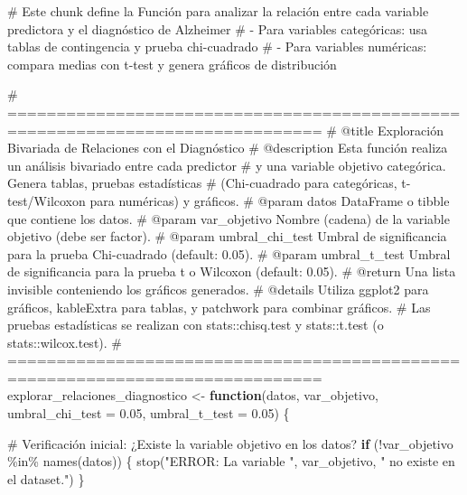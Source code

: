 \documentclass[
  letterpaper,
  DIV=11,
  numbers=noendperiod]{scrartcl}
\newenvironment{Shaded}{\begin{snugshade}}{\end{snugshade}}
\newcommand{\AttributeTok}[1]{\textcolor[rgb]{0.40,0.45,0.13}{#1}}
\newcommand{\CommentTok}[1]{\textcolor[rgb]{0.37,0.37,0.37}{#1}}
\newcommand{\ControlFlowTok}[1]{\textcolor[rgb]{0.00,0.23,0.31}{\textbf{#1}}}
\newcommand{\FloatTok}[1]{\textcolor[rgb]{0.68,0.00,0.00}{#1}}
\newcommand{\FunctionTok}[1]{\textcolor[rgb]{0.28,0.35,0.67}{#1}}
\newcommand{\NormalTok}[1]{\textcolor[rgb]{0.00,0.23,0.31}{#1}}
\newcommand{\OtherTok}[1]{\textcolor[rgb]{0.00,0.23,0.31}{#1}}
\newcommand{\SpecialCharTok}[1]{\textcolor[rgb]{0.37,0.37,0.37}{#1}}
\newcommand{\StringTok}[1]{\textcolor[rgb]{0.13,0.47,0.30}{#1}}
\begin{document}
\begin{Shaded}
\begin{Highlighting}[]
\CommentTok{\# Este chunk define la Función para analizar la relación entre cada variable predictora y el diagnóstico de Alzheimer}
\CommentTok{\# {-} Para variables categóricas: usa tablas de contingencia y prueba chi{-}cuadrado}
\CommentTok{\# {-} Para variables numéricas: compara medias con t{-}test y genera gráficos de distribución}

\CommentTok{\# ==============================================================================}
\CommentTok{\#\textquotesingle{} @title Exploración Bivariada de Relaciones con el Diagnóstico}
\CommentTok{\#\textquotesingle{} @description Esta función realiza un análisis bivariado entre cada predictor}
\CommentTok{\#\textquotesingle{} y una variable objetivo categórica. Genera tablas, pruebas estadísticas}
\CommentTok{\#\textquotesingle{} (Chi{-}cuadrado para categóricas, t{-}test/Wilcoxon para numéricas) y gráficos.}
\CommentTok{\#\textquotesingle{} @param datos DataFrame o tibble que contiene los datos.}
\CommentTok{\#\textquotesingle{} @param var\_objetivo Nombre (cadena) de la variable objetivo (debe ser factor).}
\CommentTok{\#\textquotesingle{} @param umbral\_chi\_test Umbral de significancia para la prueba Chi{-}cuadrado (default: 0.05).}
\CommentTok{\#\textquotesingle{} @param umbral\_t\_test Umbral de significancia para la prueba t o Wilcoxon (default: 0.05).}
\CommentTok{\#\textquotesingle{} @return Una lista invisible conteniendo los gráficos generados.}
\CommentTok{\#\textquotesingle{} @details Utiliza \textasciigrave{}ggplot2\textasciigrave{} para gráficos, \textasciigrave{}kableExtra\textasciigrave{} para tablas, y \textasciigrave{}patchwork\textasciigrave{} para combinar gráficos.}
\CommentTok{\#\textquotesingle{} Las pruebas estadísticas se realizan con \textasciigrave{}stats::chisq.test\textasciigrave{} y \textasciigrave{}stats::t.test\textasciigrave{} (o \textasciigrave{}stats::wilcox.test\textasciigrave{}).}
\CommentTok{\# ==============================================================================}
\NormalTok{explorar\_relaciones\_diagnostico }\OtherTok{\textless{}{-}} \ControlFlowTok{function}\NormalTok{(datos, }
\NormalTok{                                            var\_objetivo, }
                                            \AttributeTok{umbral\_chi\_test =} \FloatTok{0.05}\NormalTok{, }
                                            \AttributeTok{umbral\_t\_test =} \FloatTok{0.05}\NormalTok{) \{}

  \CommentTok{\# Verificación inicial: ¿Existe la variable objetivo en los datos?}
  \ControlFlowTok{if}\NormalTok{ (}\SpecialCharTok{!}\NormalTok{var\_objetivo }\SpecialCharTok{\%in\%} \FunctionTok{names}\NormalTok{(datos)) \{}
    \FunctionTok{stop}\NormalTok{(}\StringTok{"ERROR: La variable \textquotesingle{}"}\NormalTok{, var\_objetivo, }\StringTok{"\textquotesingle{} no existe en el dataset."}\NormalTok{)}
\NormalTok{  \}}
  

\end{Highlighting}
\end{Shaded}
\end{document}
